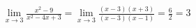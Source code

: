 \begin{ex}
\begin{align}
&\lim_{x\rightarrow 3} \frac{x^2-9}{x^2-4x+3}=\lim_{x\rightarrow 3} \frac{(x-3)(x+3)}{(x-3)(x-1)}=\frac{6}{2}=3\nonumber
\end{align}
\end{ex}